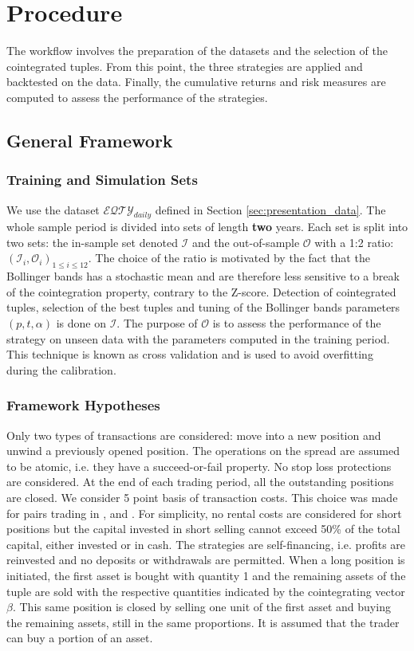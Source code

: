 \documentclass[11pt,a4,twosided,singlespacing,titlepagenumber=on]{scrreprt}
\numberwithin{equation}{chapter} %
\theoremstyle{remark}
\begin{document}
\chapter{Procedure}
The workflow involves the preparation of the datasets and the selection of the cointegrated tuples. From this point, the three strategies are applied and backtested on the data. Finally, the cumulative returns and risk measures are computed to assess the performance of the strategies.

\section{General Framework}

\subsection{Training and Simulation Sets}
We use the dataset $\mathcal{EQTY}_{daily}$ defined in Section \ref{sec:presentation_data}. The whole sample period is divided into sets of length \textbf{two} years. Each set is split into two sets: the in-sample set denoted $\mathcal{I}$ and the out-of-sample $\mathcal{O}$ with a 1:2 ratio: $(\mathcal{I}_i, \mathcal{O}_i)_{1 \leq i \leq 12}$. The choice of the ratio is motivated by the fact that the Bollinger bands has a stochastic mean and are therefore less sensitive to a break of the cointegration property, contrary to the Z-score. Detection of cointegrated tuples, selection of the best tuples and tuning of the Bollinger bands parameters $(p,t,\alpha)$ is done on $\mathcal{I}$. The purpose of $\mathcal{O}$ is to assess the performance of the strategy on unseen data with the parameters computed in the training period. This technique is known as cross validation and is used to avoid overfitting during the calibration. 


\subsection{Framework Hypotheses}

Only two types of transactions are considered: move into a new position and unwind a previously opened position. The operations on the spread are assumed to be atomic, i.e. they have a succeed-or-fail property. No stop loss protections are considered. At the end of each trading period, all the outstanding positions are closed. We consider 5 point basis of transaction costs. This choice was made for pairs trading in \cite{dunis2010}, \cite{dunis2005} and \cite{alexander2002}. For simplicity, no rental costs are considered for short positions but the capital invested in short selling cannot exceed 50\% of the total capital, either invested or in cash. The strategies are self-financing, i.e. profits are reinvested and no deposits or withdrawals are permitted. When a long position is initiated, the first asset is bought with quantity 1 and the remaining assets of the tuple are sold with the respective quantities indicated by the cointegrating vector $\beta$. This same position is closed by selling one unit of the first asset and buying the remaining assets, still in the same proportions. It is assumed that the trader can buy a portion of an asset.
\end{document}
